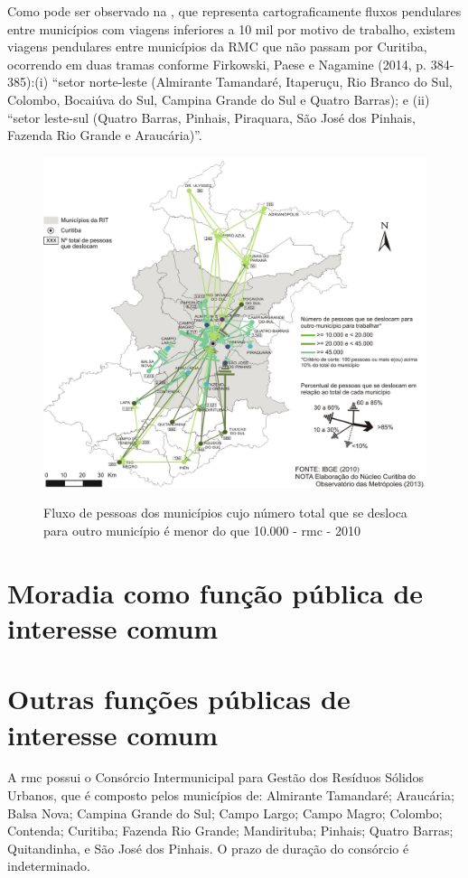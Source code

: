 	Como pode ser observado na , que representa cartograficamente fluxos pendulares entre municípios com viagens inferiores a 10 mil por motivo de trabalho, existem viagens pendulares entre municípios da RMC que não passam por Curitiba, ocorrendo em duas tramas conforme Firkowski, Paese e Nagamine (2014, p. 384-385):(i) “setor norte-leste (Almirante Tamandaré, Itaperuçu, Rio Branco do Sul, Colombo, Bocaiúva do Sul, Campina Grande do Sul e Quatro Barras); e (ii) ``setor leste-sul (Quatro Barras, Pinhais, Piraquara, São José dos Pinhais, Fazenda Rio Grande e Araucária)''.

	\begin{figure}
		\centering
		\caption{Fluxo de pessoas dos municípios cujo número total que se desloca para outro município é menor do que 10.000 - \gls{rmc} - 2010}
		\includegraphics[width=0.7\linewidth]{img/paese2014a_02}
		\label{fig:paese2014a02}
	\end{figure}
	
	\section{Moradia como função pública de interesse comum}
	
	\section{Outras funções públicas de interesse comum}
	
	A \gls{rmc} possui o Consórcio Intermunicipal para Gestão dos Resíduos Sólidos Urbanos, que é composto pelos municípios de: Almirante Tamandaré; Araucária; Balsa Nova; Campina Grande do Sul; Campo Largo; Campo Magro; Colombo; Contenda; Curitiba; Fazenda Rio Grande; Mandirituba; Pinhais; Quatro Barras; Quitandinha, e São José dos Pinhais. O prazo de duração do consórcio é indeterminado.
	
